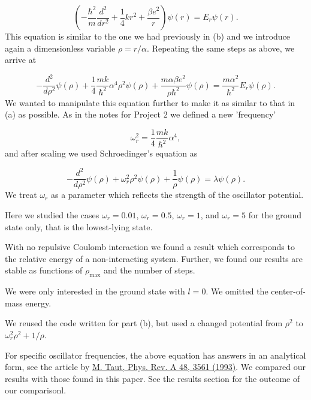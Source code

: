 \documentclass[10pt,showpacs,preprintnumbers,footinbib,amsmath,amssymb,aps,prl,twocolumn,groupedaddress,superscriptaddress,showkeys]{revtex4-1}
\begin{document}
\begin{equation*}
\left(  -\frac{\hbar^2}{m} \frac{d^2}{dr^2}+ \frac{1}{4}k r^2+\frac{\beta e^2}{r}\right)\psi(r)  = E_r \psi(r).
\end{equation*}
This equation is similar to the one we had previously in (b) and we introduce
again a dimensionless variable $\rho = r/\alpha$. Repeating the same
steps as above, we arrive at

\begin{equation*}
  -\frac{d^2}{d\rho^2} \psi(\rho) 
       + \frac{1}{4}\frac{mk}{\hbar^2} \alpha^4\rho^2\psi(\rho)+\frac{m\alpha \beta e^2}{\rho\hbar^2}\psi(\rho)  = 
\frac{m\alpha^2}{\hbar^2}E_r \psi(\rho) .
\end{equation*}
We wanted to manipulate this equation further to make it as similar to that in (a)
as possible. As in the notes for Project 2 we defined a new 'frequency'

\begin{equation*}
\omega_r^2=\frac{1}{4}\frac{mk}{\hbar^2} \alpha^4,
\end{equation*}
and after scaling we used Schroedinger's equation as

\begin{equation*}
  -\frac{d^2}{d\rho^2} \psi(\rho) + \omega_r^2\rho^2\psi(\rho) +\frac{1}{\rho}\psi(\rho) = \lambda \psi(\rho).
\end{equation*}
We treat $\omega_r$ as a parameter which reflects the strength of the oscillator potential.

Here we studied the cases $\omega_r = 0.01$, $\omega_r = 0.5$, $\omega_r =1$,
and $\omega_r = 5$   
for the ground state only, that is the lowest-lying state.


With no repulsive Coulomb interaction we found a result which corresponds to 
the relative energy of a non-interacting system.   
Further, we found our results are 
stable as functions of $\rho_{\mathrm{max}}$ and the number of steps.

We were only interested in the ground state with $l=0$. We omitted the 
center-of-mass energy.

We reused the code written for part (b), 
but used a changed potential from $\rho^2$ to $\omega_r^2\rho^2+1/\rho$. 


For specific oscillator frequencies, the above equation has answers in an analytical form,
see the article by \href{{http://prola.aps.org/abstract/PRA/v48/i5/p3561_1}}{M. Taut, Phys. Rev. A 48, 3561 (1993)}. We compared our results with those found in this paper. See the results section for the outcome of our comparisonl.
\end{document}
